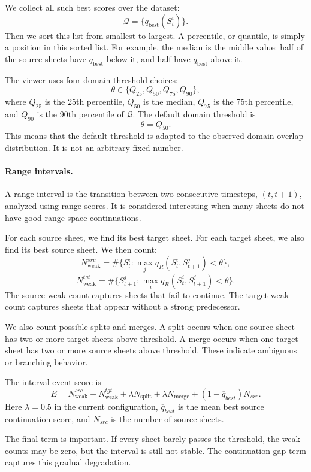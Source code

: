   We collect all such best scores over the dataset:
  \[
  \mathcal{Q}
  =
  \{q_{\mathrm{best}}(S_t^i)\}.
  \]
  Then we sort this list from smallest to largest. A percentile, or quantile, is simply a position in this sorted list. For
  example, the median is the middle value: half of the source sheets have $q_{\mathrm{best}}$ below it, and half have
  $q_{\mathrm{best}}$ above it.

  The viewer uses four domain threshold choices:
  \[
  \theta \in \{Q_{25}, Q_{50}, Q_{75}, Q_{90}\},
  \]
  where $Q_{25}$ is the 25th percentile, $Q_{50}$ is the median, $Q_{75}$ is the 75th percentile, and $Q_{90}$ is the 90th
  percentile of $\mathcal{Q}$. The default domain threshold is
  \[
  \theta = Q_{50}.
  \]
  This means that the default threshold is adapted to the observed domain-overlap distribution. It is not an arbitrary
  fixed number.


  \paragraph{Range intervals.}
  A range interval is the transition between two consecutive timesteps, $(t,t+1)$, analyzed using range scores. It is
  considered interesting when many sheets do not have good range-space continuations.

  For each source sheet, we find its best target sheet. For each target sheet, we also find its best source sheet. We then
  count:
  \[
  N_{\mathrm{weak}}^{src}
  =
  \#\{S_t^i : \max_j q_R(S_t^i,S_{t+1}^j)<\theta\},
  \]
  \[
  N_{\mathrm{weak}}^{tgt}
  =
  \#\{S_{t+1}^j : \max_i q_R(S_t^i,S_{t+1}^j)<\theta\}.
  \]
  The source weak count captures sheets that fail to continue. The target weak count captures sheets that appear without a
  strong predecessor.

  We also count possible splits and merges. A split occurs when one source sheet has two or more target sheets above
  threshold. A merge occurs when one target sheet has two or more source sheets above threshold. These indicate ambiguous
  or branching behavior.

  The interval event score is
  \[
  E =
  N_{\mathrm{weak}}^{src}
  +
  N_{\mathrm{weak}}^{tgt}
  +
  \lambda N_{\mathrm{split}}
  +
  \lambda N_{\mathrm{merge}}
  +
  (1-\overline{q}_{best})N_{src}.
  \]
  Here $\lambda=0.5$ in the current configuration, $\overline{q}_{best}$ is the mean best source continuation score, and
  $N_{src}$ is the number of source sheets.

  The final term is important. If every sheet barely passes the threshold, the weak counts may be zero, but the interval is
  still not stable. The continuation-gap term captures this gradual degradation.

